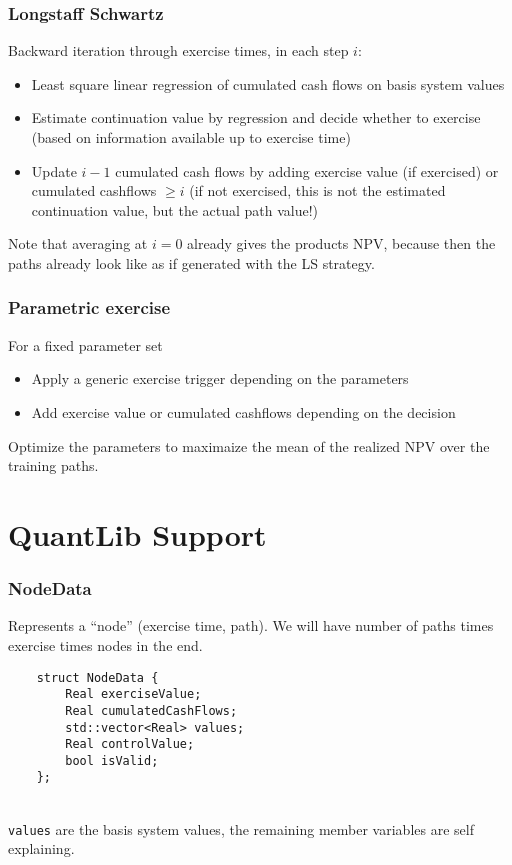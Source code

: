 \documentclass{beamer}
\begin{document}
\begin{frame}
\frametitle{Longstaff Schwartz}
Backward iteration through exercise times, in each step $i$:
\vspace{\baselineskip}
\begin{itemize}
\item Least square linear regression of cumulated cash flows on basis system values
\item Estimate continuation value by regression and decide whether to exercise (based on information
available up to exercise time)
\item Update $i-1$ cumulated cash flows by adding exercise value (if exercised) or 
cumulated cashflows $\geq i$ (if not exercised, this is not the estimated continuation value, but the
actual path value!)
\end{itemize}
\vspace{\baselineskip}
Note that averaging at $i=0$ already gives the products NPV, because then the paths already look like
as if generated with the LS strategy.
\end{frame}

\begin{frame}
\frametitle{Parametric exercise}
For a fixed parameter set
\vspace{\baselineskip}
\begin{itemize}
\item Apply a generic exercise trigger depending on the parameters
\item Add exercise value or cumulated cashflows depending on the decision
\end{itemize}
\vspace{\baselineskip}
Optimize the parameters to maximaize the mean of the realized NPV over the training paths.
\end{frame}


\section{QuantLib Support}

\begin{frame}[fragile]
\frametitle{NodeData}
Represents a ``node'' (exercise time, path). We will have number of paths times
exercise times nodes in the end.
\vspace{\baselineskip} \\
\begin{verbatim}
    struct NodeData {
        Real exerciseValue;
        Real cumulatedCashFlows;
        std::vector<Real> values;
        Real controlValue;
        bool isValid;
    };
\end{verbatim}
\vspace{\baselineskip} \\
\verb+values+ are the basis system values, the remaining member variables are self
explaining.
\end{frame}
\end{document}
